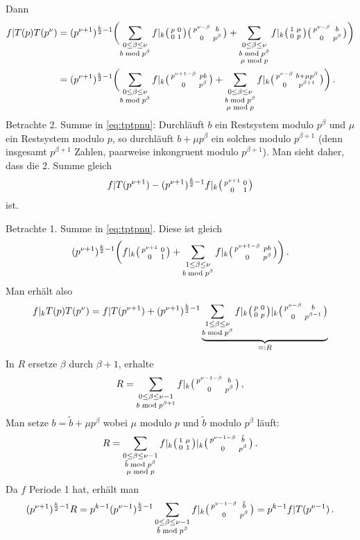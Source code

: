 \begin{bewe}
	Dann
	\begin{align}\label{eq:tptpnu}
	f|T(p)T(p^\nu)
	&= (p^{\nu+1})^{\frac{k}{2}-1} \biggl( \sum_{\substack{0 \leq \beta \leq \nu \\ b \bmod p^\beta}} f|_k \mymat p001 \mymat {p^{\nu-\beta}}b0{p^\beta} + \sum_{\substack{0 \leq \beta \leq \nu \\ b \bmod p^\beta \\ \mu\bmod p}} f|_k \mymat 1\mu0p \mymat {p^{\nu-\beta}}b0{p^\beta} \biggr) \nonumber \\
	&= (p^{\nu+1})^{\frac{k}{2}-1} \biggl( \sum_{\substack{0 \leq \beta \leq \nu\\b \bmod p^\beta}} f|_k \mymat {p^{\nu +1-\beta}}{pb}{0}{p^\beta} + \sum_{\substack{0 \leq \beta \leq \nu \\ b \bmod p^\beta \\ \mu \bmod p}} f|_k \mymat{p^{\nu-\beta}}{b+\mu p^\beta}0{p^{\beta+1}} \biggr)
	\,.
	\end{align}
	Betrachte 2. Summe in \eqref{eq:tptpnu}:
	Durchläuft $b$ ein Restsystem modulo $p^\beta$ und $\mu$ ein Restsystem modulo $p$, so durchläuft $b+\mu p^\beta$ ein solches modulo $p^{\beta+1}$ (denn insgesamt $p^{\beta+1}$ Zahlen, paarweise inkongruent modulo $p^{\beta+1}$).
	Man sieht daher, dass die 2. Summe gleich
	\[
	f|T(p^{\nu+1}) - (p^{\nu+1})^{\frac{k}{2}-1} f|_k \mymat {p^{\nu+1}}001
	\]
	ist.
	
	Betrachte 1. Summe in \eqref{eq:tptpnu}. Diese ist gleich
	\[
	(p^{\nu + 1})^{\frac{k}{2}-1} \biggl(f|_k \mymat{p^{\nu+1}}001 + \sum_{\substack{1 \leq \beta \leq \nu \\ b \bmod p^\beta}} f|_k \mymat{p^{\nu+1-\beta}}{pb}0{p^\beta} \biggr)
	\,.
	\]
	Man erhält also
	\[
	f|_k T(p)T(p^\nu)
	= f|T(p^{\nu+1}) + (p^{\nu+1})^{\frac{k}{2}-1} \underbrace{\sum_{\substack{1 \leq \beta \leq \nu\\ b \bmod p^\beta}} f|_k \mymat p00p |_k \mymat {p^{\nu-\beta}}b0{p^{\beta-1}}
	}_{=: R}
	\]
	In $R$ ersetze $\beta$ durch $\beta + 1$, erhalte
	\[
	R = \sum_{\substack{0 \leq \beta \leq \nu-1\\ b \bmod p^{\beta+1} }} f|_k \mymat {p^{\nu-1-\beta}}b0{p^{\beta}}
	\,,
	\]
	Man setze $b = \tilde b + \mu p^\beta$ wobei $\mu$ modulo $p$ und $\tilde b$ modulo $p^\beta$ läuft:
	\[
	R = \sum_{\substack{ 0 \leq \beta \leq \nu-1\\ \tilde b \bmod p^\beta \\ \mu \bmod p}} f|_k \mymat 1\mu01 |_k \mymat {p^{\nu-1-\beta}}{\tilde b}0{p^\beta}
	\,.
	\]
	Da $f$ Periode 1 hat, erhält man
	\[
	(p^{\nu+1})^{\frac{k}{2}-1}R
	= p^{k-1}(p^{\nu-1})^{\frac{k}{2}-1} \sum_{\substack{0 \leq \beta \leq \nu-1 \\ \tilde b \bmod p^\beta}} f|_k \mymat {p^{\nu-1-\beta}}{\tilde b}0{p^\beta}
	= p^{k-1} f|T(p^{\nu-1})
	\,.
	\]
	

\end{bewe}
